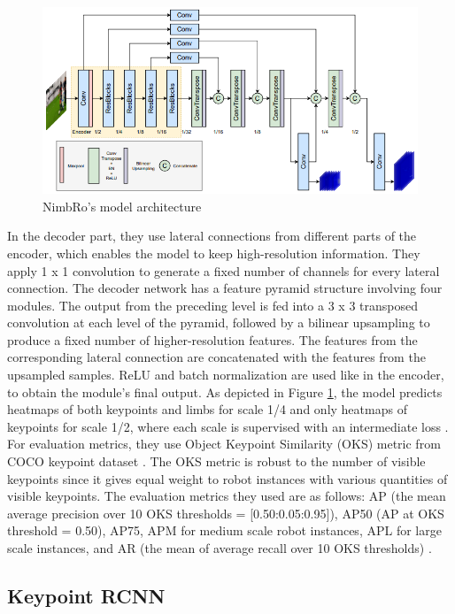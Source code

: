 \begin{figure}[ht]
  \centering
  \includegraphics[scale=1]{gambar/nimbro-architecture.png}
  \caption{NimbRo's model architecture}
  \label{fig:nimbro-model-architecture}
\end{figure}

In the decoder part, they use lateral connections from different parts of the encoder, which enables the model to keep high-resolution information. They apply 1 x 1 convolution to generate a fixed number of channels for every lateral connection.
The decoder network has a feature pyramid structure involving four modules. The output from the preceding level is fed into a 3 x 3 transposed convolution at each level of the pyramid, followed by a bilinear upsampling to produce a fixed number of higher-resolution features.
The features from the corresponding lateral connection are concatenated with the features from the upsampled samples. ReLU and batch normalization are used like in the encoder, to obtain the module's final output.
As depicted in Figure \ref{fig:nimbro-model-architecture}, the model predicts heatmaps of both keypoints and limbs for scale 1/4 and only
heatmaps of keypoints for scale 1/2, where each scale is supervised with an intermediate loss \parencite{amini2021}.
For evaluation metrics, they use Object Keypoint Similarity (OKS) metric from COCO keypoint dataset \parencite{ronchi2017}.
The OKS metric is robust to the number of visible keypoints since it gives equal weight to robot instances with various quantities of visible keypoints.
The evaluation metrics they used are as follows: AP (the mean average precision over 10 OKS thresholds = [0.50:0.05:0.95]), AP50
(AP at OKS threshold = 0.50), AP75, APM for medium scale robot instances, APL for large scale instances, and AR (the mean of average recall over 10 OKS thresholds) \parencite{amini2021}.

\subsection{Keypoint RCNN}
\label{subsec:rcnn}

